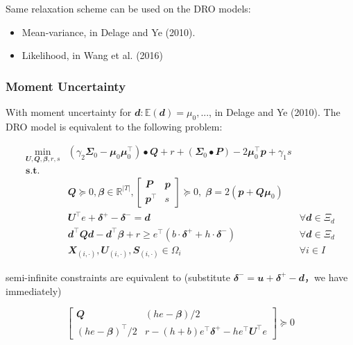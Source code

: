 \documentclass[
  a4paper,
,tablecaptionabove
]{scrartcl}
\numberwithin{equation}{section}
\providecommand{\tightlist}{%
  \setlength{\itemsep}{0pt}\setlength{\parskip}{0pt}}
\begin{document}
Same relaxation scheme can be used on the DRO models:

\begin{itemize}
\tightlist
\item
  Mean-variance, in Delage and Ye (2010).
\item
  Likelihood, in Wang et al. (2016)
\end{itemize}

\hypertarget{moment-uncertainty}{%
\subsubsection{Moment Uncertainty}\label{moment-uncertainty}}

With moment uncertainty for
\(\mathbfit d: \mathbb{E}(\mathbfit d) = \mu_0, ...\), in Delage and
Ye (2010). The DRO model is equivalent to the following problem:

\[\begin{aligned}
\min_{\mathbfit{U}, \mathbfit{Q}, \mathbfit{\beta}, r, s} & \left(\gamma_{2} \mathbfit{\Sigma}_{0}-\mathbfit{\mu}_{0} \mathbfit{\mu}_{0}^{\top}\right) \bullet \mathbfit{Q}+r+\left(\mathbfit{\Sigma}_{0} \bullet \mathbfit{P}\right)-2 \mathbfit{\mu}_{0}^{\top} \mathbfit{p} + \gamma_{1} s \\
\mathbf { s.t. } & \\
& \mathbfit{Q} \succeq 0, \mathbfit{\beta} \in \mathbb{R}^{|T|}, 
\begin{bmatrix}
  \mathbfit{P} & \mathbfit{p} \\
  \mathbfit{p}^\top & s
\end{bmatrix} \succeq 0, \; 
\mathbfit \beta = 2 (\mathbfit p + \mathbfit{Q\mu}_0)\\
& \mathbfit{U} ^\top e + \mathbfit \delta^+ - \mathbfit \delta^-  = \mathbfit d & \forall \mathbfit d \in \Xi_d\\
& \mathbfit{d}^{\top} \mathbfit{Q} \mathbfit{d} -\mathbfit{d^\top\beta} + r \ge e^\top( b \cdot\mathbfit{\delta^+}  + h\cdot \mathbfit \delta^-) & \forall \mathbfit d \in \Xi_d \\
& \mathbfit X_{(i,\cdot)}, \mathbfit U_{(i,\cdot)}, \mathbfit S_{(i,\cdot)} \in \Omega_i & \forall i\in I
\end{aligned}\]

semi-infinite constraints are equivalent to (substitute
\(\mathbfit\delta^- = \mathbfit u + \mathbfit \delta^+ - \mathbfit d\)，we
have immediately)

\[\begin{bmatrix}
  \mathbfit Q &  (he- \mathbfit \beta)/2 \\
  (he- \mathbfit \beta)^\top/2 & r - (h+b)e^\top \mathbfit \delta^+ - h e^\top   \mathbfit U^\top e
\end{bmatrix} \succeq 0\]
\end{document}
